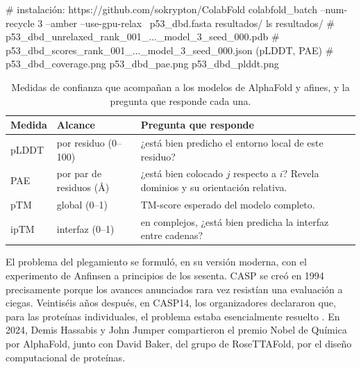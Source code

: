 \begin{consola}
# instalación: https://github.com/sokrypton/ColabFold
colabfold_batch --num-recycle 3 --amber --use-gpu-relax \
    p53_dbd.fasta resultados/
ls resultados/
# p53_dbd_unrelaxed_rank_001_..._model_3_seed_000.pdb
# p53_dbd_scores_rank_001_..._model_3_seed_000.json  (pLDDT, PAE)
# p53_dbd_coverage.png  p53_dbd_pae.png  p53_dbd_plddt.png
\end{consola}

\begin{table}[t]
\centering\small
\caption[Medidas de confianza de los predictores]{Medidas de confianza que acompañan a los modelos de AlphaFold y afines, y la pregunta que responde cada una.}
\label{tab:15-confianza}
\begin{tabularx}{\linewidth}{@{}>{\raggedright\arraybackslash}p{1.6cm}>{\raggedright\arraybackslash}p{2.6cm}>{\raggedright\arraybackslash}X@{}}
\toprule
\textbf{Medida} & \textbf{Alcance} & \textbf{Pregunta que responde}\\
\midrule
pLDDT & por residuo (0--100) & ¿está bien predicho el entorno local de este residuo?\\
PAE & por par de residuos (\si{\angstrom}) & ¿está bien colocado $j$ respecto a $i$? Revela dominios y su orientación relativa.\\
pTM & global (0--1) & TM-score esperado del modelo completo.\\
ipTM & interfaz (0--1) & en complejos, ¿está bien predicha la interfaz entre cadenas?\\
\bottomrule
\end{tabularx}
\end{table}

\begin{historia}
El problema del plegamiento se formuló, en su versión moderna, con el experimento de Anfinsen a principios de los sesenta. CASP se creó en 1994 precisamente porque los avances anunciados rara vez resistían una evaluación a ciegas. Veintiséis años después, en CASP14, los organizadores declararon que, para las proteínas individuales, el problema estaba esencialmente resuelto \parencite{c15-kryshtafovych2021}. En 2024, Demis Hassabis y John Jumper compartieron el premio Nobel de Química por AlphaFold, junto con David Baker, del grupo de RoseTTAFold, por el diseño computacional de proteínas.
\end{historia}




